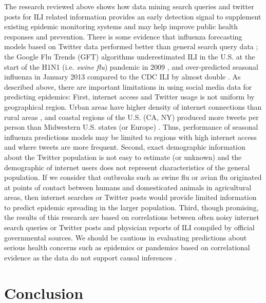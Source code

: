 \documentclass[sigconf]{acmart}
\begin{document}
The research reviewed above shows how data mining search queries and twitter posts for 
ILI related information provides an early detection signal to supplement existing epidemic 
monitoring systems and may help improve public health responses and prevention. There is 
some evidence that influenza forecasting models based on Twitter data performed better 
than general search query data \cite{paul14}; the Google Flu Trends (GFT) algorithms 
underestimated ILI in the U.S. at the start of the H1N1 (i.e. {\it swine flu}) pandemic 
in 2009 \cite{butler13}, and over-predicted seasonal influenza in January 2013 compared 
to the CDC ILI by almost double \cite{lazer14}. As described above, there are important 
limitations in using social media data for predicting epidemics: First, internet access 
and Twitter usage is not uniform by geographical region. Urban areas have higher density 
of internet connections than rural areas \cite{yuan13}, and coastal regions of the U.S. 
(CA, NY) produced more tweets per person than Midwestern U.S. states (or Europe) 
\cite{achrekar12}. Thus, performance of seasonal influenza predictions models may be 
limited to regions with high internet access and where tweets are more frequent. Second, 
exact demographic information about the Twitter population is not easy to estimate (or 
unknown) and the demographic of internet users does not represent characteristics of the 
general population. If we consider that outbreaks such as swine flu or avian flu originated 
at points of contact between humans and domesticated animals in agricultural areas, then 
internet searches or Twitter posts would provide limited information to predict epidemic 
spreading in the larger population. Third, though promising, the results of this research 
are based on correlations between often noisy internet search queries or Twitter posts and 
physician reports of ILI compiled by official governmental sources. We should be cautious 
in evaluating predictions about serious health concerns such as epidemics or pandemics 
based on correlational evidence as the data do not support causal inferences . 

\section{Conclusion}
\end{document}
